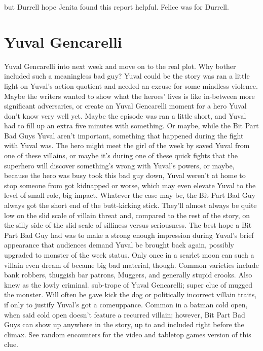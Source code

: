 \documentclass[12pt]{book}
\begin{document}
but Durrell hope Jenita found this report helpful. Felice was for Durrell.






\chapter{Yuval Gencarelli}

Yuval Gencarelli into next week and move on to the real plot. Why bother included such a meaningless bad guy? Yuval could be the story was ran a little light on Yuval's action quotient and needed an excuse for some mindless violence. Maybe the writers wanted to show what the heroes' lives is like in-between more significant adversaries, or create an Yuval Gencarelli moment for a hero Yuval don't know very well yet. Maybe the episode was ran a little short, and Yuval had to fill up an extra five minutes with something. Or maybe, while the Bit Part Bad Guys Yuval aren't important, something that happened during the fight with Yuval was. The hero might meet the girl of the week by saved Yuval from one of these villains, or maybe it's during one of these quick fights that the superhero will discover something's wrong with Yuval's powers, or maybe, because the hero was busy took this bad guy down, Yuval weren't at home to stop someone from got kidnapped or worse, which may even elevate Yuval to the level of small role, big impact. Whatever the case may be, the Bit Part Bad Guy always got the short end of the butt-kicking stick. They'll almost always be quite low on the slid scale of villain threat and, compared to the rest of the story, on the silly side of the slid scale of silliness versus seriousness. The best hope a Bit Part Bad Guy had was to make a strong enough impression during Yuval's brief appearance that audiences demand Yuval be brought back again, possibly upgraded to monster of the week status. Only once in a scarlet moon can such a villain even dream of became big bad material, though. Common varieties include bank robbers, thuggish bar patrons, Muggers, and generally stupid crooks. Also knew as the lowly criminal. sub-trope of Yuval Gencarelli; super clue of mugged the monster. Will often be gave kick the dog or politically incorrect villain traits, if only to justify Yuval's got a comeuppance. Common in a batman cold open, when said cold open doesn't feature a recurred villain; however, Bit Part Bad Guys can show up anywhere in the story, up to and included right before the climax. See random encounters for the video and tabletop games version of this clue.
\end{document}
